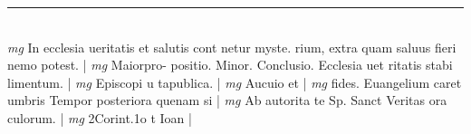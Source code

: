 \documentclass{article}
\begin{document}
\begin{pages}
\vspace{0.5cm}\noindent
\vspace{0.2cm}\rule{1cm}{0.2pt}\\ 
\hspace{0.2cm}\textit{mg}
\footnotesize In ecclesia ueritatis et salutis cont netur myste. rium, extra quam saluus fieri nemo potest. 
\normalsize| 
\hspace{0.2cm}\textit{mg}
\footnotesize Maiorpro- positio. Minor. Conclusio. Ecclesia uet ritatis stabi limentum. 
\normalsize| 
\hspace{0.2cm}\textit{mg}
\footnotesize Episcopi u tapublica. 
\normalsize| 
\hspace{0.2cm}\textit{mg}
\footnotesize Aucuio et 
\normalsize| 
\hspace{0.2cm}\textit{mg}
\footnotesize fides. Euangelium caret umbris Tempor posteriora quenam si 
\normalsize| 
\hspace{0.2cm}\textit{mg}
\footnotesize Ab autorita te Sp. Sanct Veritas ora culorum. 
\normalsize| 
\hspace{0.2cm}\textit{mg}
\footnotesize 2Corint.1o t Ioan 
\normalsize| 

\end{pages}
\end{document}
